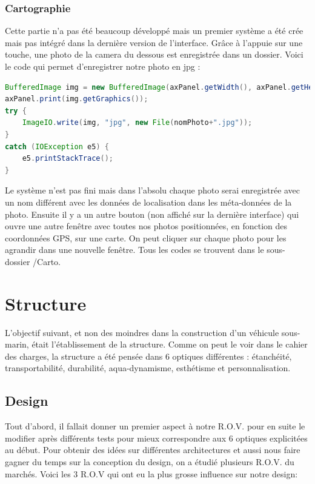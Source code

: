 \documentclass[a4paper,11pt]{report}
\begin{document}
		\subsection{Cartographie}
			\label{subsec:Cartographie}
			Cette partie n'a pas été beaucoup développé mais un premier système a été crée mais pas intégré dans la dernière version de l'interface.
			\newline Grâce à l'appuie sur une touche, une photo de la camera du dessous est enregistrée dans un dossier. Voici le code qui permet d'enregistrer notre photo en jpg :
			\begin{lstlisting}[language=java]
BufferedImage img = new BufferedImage(axPanel.getWidth(), axPanel.getHeight(), BufferedImage.TYPE_INT_RGB);
axPanel.print(img.getGraphics());
try {
	ImageIO.write(img, "jpg", new File(nomPhoto+".jpg"));
}
catch (IOException e5) {
	e5.printStackTrace();
}
		\end{lstlisting}
			Le système n'est pas fini mais dans l'absolu chaque photo serai enregistrée avec un nom différent avec les données de localisation dans les méta-données de la photo.
			\newline Ensuite il y a un autre bouton (non affiché sur la dernière interface) qui ouvre une autre fenêtre avec toutes nos photos positionnées, en fonction des coordonnées GPS, sur une carte.
			\newline On peut cliquer sur chaque photo pour les agrandir dans une nouvelle fenêtre.
			\newline Tous les codes se trouvent dans le sous-dossier /Carto.
			
			\newpage	
			
\chapter{Structure}

	L'objectif suivant, et non des moindres dans la construction d'un véhicule sous-marin, était l'établissement de la structure. Comme on peut le voir dans le cahier des charges, la structure a été pensée dans 6 optiques différentes : étanchéité, transportabilité, durabilité, aqua-dynamisme, esthétisme et personnalisation. 
				
				\section{Design}
				
				Tout d'abord, il fallait donner un premier aspect à notre R.O.V. pour en suite le modifier après différents tests pour mieux correspondre aux 6 optiques explicitées au début. Pour obtenir des idées sur différentes architectures et aussi nous faire gagner du temps sur la conception du design, on a étudié plusieurs R.O.V. du marchés. Voici les 3 R.O.V qui ont eu la plus grosse influence sur notre design:
					
\end{document}
